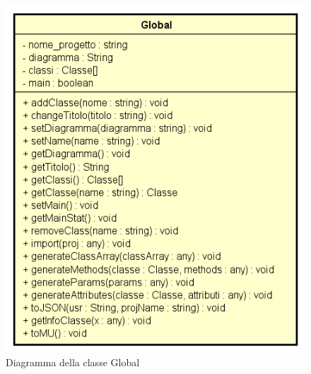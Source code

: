 \begin{figure}[h!]
	\centering
	\includegraphics[scale=0.8]{res/sections/SpecificaFrontEnd/Services/Disegnetti/global.png}
	\caption{Diagramma della classe Global}
\end{figure}

